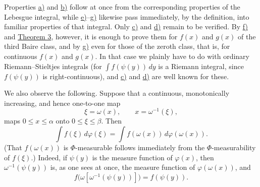 \documentclass[12pt,b5paper,twoside]{article}
\begin{document}
Properties \hyperref[prop:I.4.a]{a)} and \hyperref[prop:I.4.b]{b)} follow at once from the corresponding properties of the Lebesgue integral, while \hyperref[prop:I.4.e]{e)}--\hyperref[prop:I.4.g]{g)} likewise pass immediately, by the definition, into familiar properties of that integral. Only \hyperref[prop:I.4.c]{c)} and \hyperref[prop:I.4.d]{d)} remain to be verified. By \hyperref[prop:I.4.f]{f)} and \hyperref[thm:3]{Theorem 3}, however, it is enough to prove them for $f(x)$ and $g(x)$ of the third Baire class, and by \hyperref[prop:I.4.g]{g)} even for those of the zeroth class, that is, for continuous $f(x)$ and $g(x)$. In that case we plainly have to do with ordinary
Riemann--Stieltjes integrals (for $\int f(\psi(y))\,dy$ is a Riemann integral, since $f(\psi(y))$ is right-continuous), and \hyperref[prop:I.4.c]{c)} and \hyperref[prop:I.4.d]{d)} are well known for these.

We also observe the following. Suppose that a continuous, monotonically increasing, and hence one-to-one map
\[
 \xi=\omega(x),\qquad x=\omega^{-1}(\xi),
\]
maps $0\leq x\leq\alpha$ onto $0\leq\xi\leq\beta$. Then
\label{eq:LS-change-finite}
\begin{equation*}
 \int f(\xi)\,d\varphi(\xi)
 =\int f(\omega(x))\,d\varphi(\omega(x)).
\end{equation*}
(That $f(\omega(x))$ is $\Phi$-measurable follows immediately from the $\Phi$-measurability of $f(\xi)$.) Indeed, if $\psi(y)$ is the measure function of $\varphi(x)$, then $\omega^{-1}(\psi(y))$ is, as one sees at once, the measure function of $\varphi(\omega(x))$, and
\[
 f\bigl(\omega[\omega^{-1}(\psi(y))]\bigr)=f(\psi(y)).
\]
\end{document}
